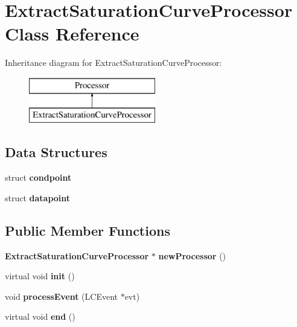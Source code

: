 \section{Extract\-Saturation\-Curve\-Processor Class Reference}
\label{classExtractSaturationCurveProcessor}
Inheritance diagram for Extract\-Saturation\-Curve\-Processor\-:\begin{figure}[H]
\begin{center}
\leavevmode
\includegraphics[height=2.000000cm]{classExtractSaturationCurveProcessor}
\end{center}
\end{figure}
\subsection*{Data Structures}
\begin{DoxyCompactItemize}
\item 
struct {\bf condpoint}
\item 
struct {\bf datapoint}
\end{DoxyCompactItemize}
\subsection*{Public Member Functions}
\begin{DoxyCompactItemize}
\item 
{\bf Extract\-Saturation\-Curve\-Processor} $\ast$ {\bfseries new\-Processor} ()\label{classExtractSaturationCurveProcessor_ac1cb6cef4f5a0a82ab72e103082a580d}

\item 
virtual void {\bfseries init} ()\label{classExtractSaturationCurveProcessor_a7feca5d6491897eb4a0642745c568049}

\item 
void {\bfseries process\-Event} (L\-C\-Event $\ast$evt)\label{classExtractSaturationCurveProcessor_a54c0e4af7a3c2c35c367035faedaf50c}

\item 
virtual void {\bfseries end} ()\label{classExtractSaturationCurveProcessor_aedeae6bf28cea73d8dbfb07307e8caa3}

\end{DoxyCompactItemize}
